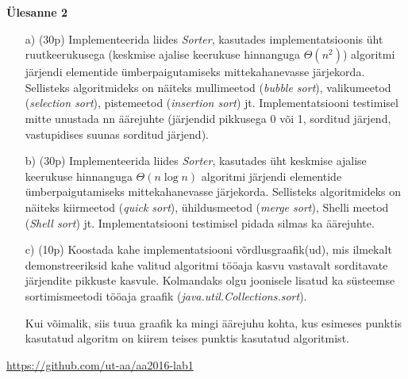 \documentclass[a4paper]{article}
\begin{document}
\begin{problem}
\textbf{Ülesanne 2}

\begin{enumerate}
\item[a)] (30p) Implementeerida liides \textit{Sorter}, kasutades implementatsioonis üht ruutkeerukusega
(keskmise ajalise keerukuse hinnanguga $\Theta(n^2)$) algoritmi järjendi elementide
ümberpaigutamiseks mittekahanevasse järjekorda.  Sellisteks
algoritmideks on näiteks mullimeetod ({\it bubble sort}), valikumeetod
({\it selection sort}), pistemeetod ({\it insertion sort}) jt.
Implementatsiooni testimisel mitte unustada nn äärejuhte (järjendid pikkusega 0 või 1, sorditud järjend, vastupidises suunas sorditud
järjend).
\item[b)] (30p) Implementeerida liides \textit{Sorter}, kasutades üht keskmise ajalise
keerukuse hinnanguga  $ \Theta(n\log n)$ algoritmi järjendi elementide
ümberpaigutamiseks mittekahanevasse järjekorda. Sellisteks algoritmideks
on näiteks kiirmeetod ({\it quick sort}), ühildusmeetod ({\it merge
sort}), Shelli meetod ({\it Shell sort}) jt. Implementatsiooni testimisel pidada silmas ka äärejuhte.
\item[c)] (10p) Koostada kahe implementatsiooni võrdlusgraafik(ud), mis ilmekalt
demonstreeriksid kahe valitud algoritmi tööaja kasvu vastavalt sorditavate järjendite pikkuste kasvule. Kolmandaks olgu joonisele lisatud ka süsteemse sortimismeetodi tööaja graafik (\textit{java.util.Collections.sort}). 

Kui võimalik, siis tuua graafik ka mingi äärejuhu kohta, kus esimeses punktis kasutatud algoritm on kiirem teises punktis kasutatud algoritmist.
\end{enumerate}
\end{problem}

\url{https://github.com/ut-aa/aa2016-lab1}
\end{document}
